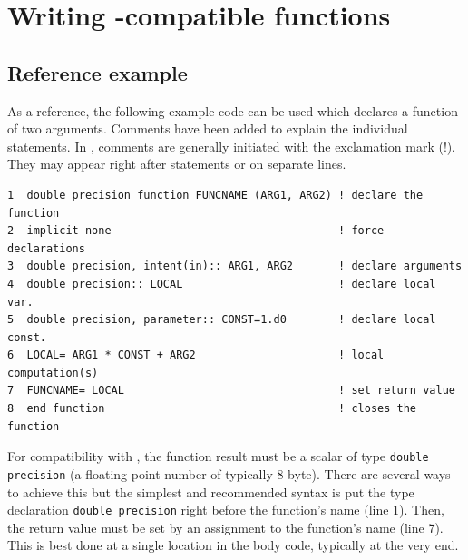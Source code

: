 \documentclass[times,onecolumn]{article}
\begin{document}


\section{Writing -compatible  functions} \label{sec:fortranFunctions}

\subsection{Reference example}

As a reference, the following example code can be used which declares a function of two arguments. Comments have been added to explain the individual statements. In , comments are generally initiated with the exclamation mark (!). They may appear right after statements or on separate lines.

\begin{shaded}
\begin{small}
\begin{verbatim}
1  double precision function FUNCNAME (ARG1, ARG2) ! declare the function
2  implicit none                                   ! force declarations
3  double precision, intent(in):: ARG1, ARG2       ! declare arguments
4  double precision:: LOCAL                        ! declare local var.
5  double precision, parameter:: CONST=1.d0        ! declare local const.
6  LOCAL= ARG1 * CONST + ARG2                      ! local computation(s)
7  FUNCNAME= LOCAL                                 ! set return value
8  end function                                    ! closes the function
\end{verbatim}
\end{small}
\end{shaded}

For compatibility with , the function result must be a scalar of type \verb|double precision| (a floating point number of typically 8 byte). There are several ways to achieve this but the simplest and recommended syntax is put the type declaration \verb|double precision| right before the function's name (line 1). Then, the return value must be set by an assignment to the function's name (line 7). This is best done at a single location in the body code, typically at the very end.
\end{document}
